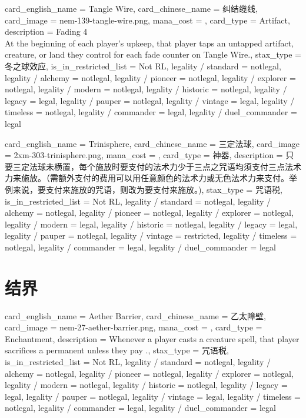 \documentclass[lang = cn, color = black, 10pt]{AllThatStax}
\begin{document}
\card
{
	card_english_name = {Tangle Wire},
	card_chinese_name = {纠结缆线},
	card_image = nem-139-tangle-wire.png,
	mana_cost = ,
	card_type = Artifact,
	description = {Fading 4 \\
		At the beginning of each player's upkeep, that player taps an untapped artifact, creature, or land they control for each fade counter on Tangle Wire.},
	stax_type = 冬之球效应,
	is_in_restricted_list = Not RL,
	legality / standard = notlegal,
	legality / alchemy = notlegal,
	legality / pioneer = notlegal,
	legality / explorer = notlegal,
	legality / modern = notlegal,
	legality / historic = notlegal,
	legality / legacy = legal,
	legality / pauper = notlegal,
	legality / vintage = legal,
	legality / timeless = notlegal,
	legality / commander = legal,
	legality / duel_commander = legal
}

\card
{
	card_english_name = {Trinisphere},
	card_chinese_name = {三定法球},
	card_image = 2xm-303-trinisphere.png,
	mana_cost = ,
	card_type = 神器,
	description = {只要三定法球未横置，每个施放时要支付的法术力少于三点之咒语均须支付三点法术力来施放。（需额外支付的费用可以用任意颜色的法术力或无色法术力来支付。举例来说，要支付来施放的咒语，则改为要支付来施放。)},
	stax_type = 咒语税,
	is_in_restricted_list = Not RL,
	legality / standard = notlegal,
	legality / alchemy = notlegal,
	legality / pioneer = notlegal,
	legality / explorer = notlegal,
	legality / modern = legal,
	legality / historic = notlegal,
	legality / legacy = legal,
	legality / pauper = notlegal,
	legality / vintage = restricted,
	legality / timeless = notlegal,
	legality / commander = legal,
	legality / duel_commander = legal
}

\section{结界}

\card
{
	card_english_name = {Aether Barrier},
	card_chinese_name = {乙太障壁},
	card_image = nem-27-aether-barrier.png,
	mana_cost = ,
	card_type = Enchantment,
	description = {Whenever a player casts a creature spell, that player sacrifices a permanent unless they pay .},
	stax_type = 咒语税,
	is_in_restricted_list = Not RL,
	legality / standard = notlegal,
	legality / alchemy = notlegal,
	legality / pioneer = notlegal,
	legality / explorer = notlegal,
	legality / modern = notlegal,
	legality / historic = notlegal,
	legality / legacy = legal,
	legality / pauper = notlegal,
	legality / vintage = legal,
	legality / timeless = notlegal,
	legality / commander = legal,
	legality / duel_commander = legal
}
\end{document}
